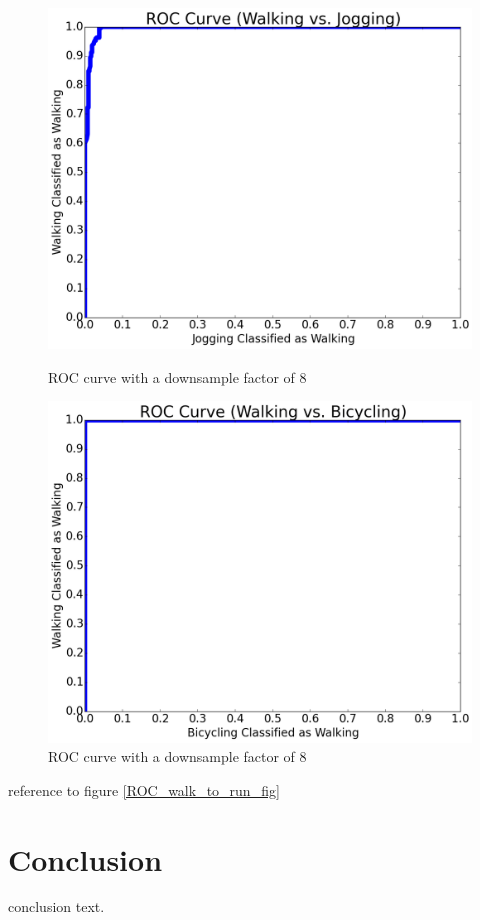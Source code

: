\documentclass[journal]{IEEEtran}
\begin{document}
\begin{figure}[!tbp]
\RawFloats
  \centering
     \begin{minipage}[b]{0.45\textwidth}
        \includegraphics[angle=0,width=\textwidth]{ROC_walk_to_run.png}
        \caption{\label{ROC_walk_to_run_fig}ROC curve with a downsample factor of 8}
     \end{minipage}
     \hfill
     \begin{minipage}[b]{0.45\textwidth}
     \includegraphics[angle=0,width=\textwidth]{ROC_walk_to_bike.png}
        \caption{\label{ROC_walk_to_bike_fig}ROC curve with a downsample factor of 8}
     \end{minipage}
\end{figure}
reference to figure \ref{ROC_walk_to_run_fig}
%
\section{Conclusion}
conclusion text.
%
\appendices
%
\ifCLASSOPTIONcaptionsoff
  \newpage
\fi
%


\end{document}
